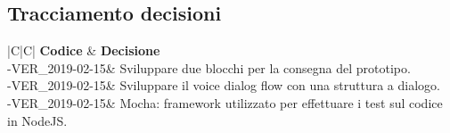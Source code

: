 \documentclass[a4paper,12pt]{article}
\begin{document}
	\subsection{Tracciamento decisioni}
	\begin{table}[tbph]
		\centering
		\begin{tabularx}{\textwidth}{|C|C|}
			\hline
			\textbf{Codice } & \textbf{Decisione} \\
			-VER\_2019-02-15& Sviluppare due blocchi per la consegna del prototipo.\\
			-VER\_2019-02-15& Sviluppare il voice dialog flow con una struttura a dialogo.\\
			-VER\_2019-02-15& Mocha: framework utilizzato per effettuare i test sul codice in NodeJS.\\
			
			\hline
		\end{tabularx}
		\caption{Tracciamento decisioni}
	\end{table}
	\label{LastPage}
\end{document}
